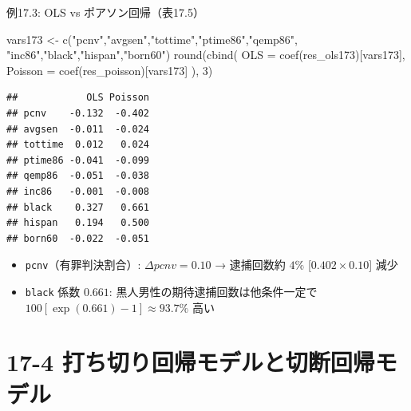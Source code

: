 \documentclass[
  ignorenonframetext,
]{beamer}
\newenvironment{Shaded}{\begin{snugshade}}{\end{snugshade}}
\newcommand{\AttributeTok}[1]{\textcolor[rgb]{0.77,0.63,0.00}{#1}}
\newcommand{\DecValTok}[1]{\textcolor[rgb]{0.00,0.00,0.81}{#1}}
\newcommand{\FunctionTok}[1]{\textcolor[rgb]{0.00,0.00,0.00}{#1}}
\newcommand{\NormalTok}[1]{#1}
\newcommand{\OtherTok}[1]{\textcolor[rgb]{0.56,0.35,0.01}{#1}}
\newcommand{\StringTok}[1]{\textcolor[rgb]{0.31,0.60,0.02}{#1}}
\providecommand{\tightlist}{%
  \setlength{\itemsep}{0pt}\setlength{\parskip}{0pt}}
\begin{document}
\begin{frame}[fragile]{例17.3: OLS vs ポアソン回帰（表17.5）}
\protect\hypertarget{ux4f8b17.3-ols-vs-ux30ddux30a2ux30bdux30f3ux56deux5e30ux886817.5}{}
\scriptsize

\begin{Shaded}
\begin{Highlighting}[]
\NormalTok{vars173 }\OtherTok{\textless{}{-}} \FunctionTok{c}\NormalTok{(}\StringTok{"pcnv"}\NormalTok{,}\StringTok{"avgsen"}\NormalTok{,}\StringTok{"tottime"}\NormalTok{,}\StringTok{"ptime86"}\NormalTok{,}\StringTok{"qemp86"}\NormalTok{,}
             \StringTok{"inc86"}\NormalTok{,}\StringTok{"black"}\NormalTok{,}\StringTok{"hispan"}\NormalTok{,}\StringTok{"born60"}\NormalTok{)}
\FunctionTok{round}\NormalTok{(}\FunctionTok{cbind}\NormalTok{(}
  \AttributeTok{OLS     =} \FunctionTok{coef}\NormalTok{(res\_ols173)[vars173],}
  \AttributeTok{Poisson =} \FunctionTok{coef}\NormalTok{(res\_poisson)[vars173]}
\NormalTok{), }\DecValTok{3}\NormalTok{)}
\end{Highlighting}
\end{Shaded}

\begin{verbatim}
##            OLS Poisson
## pcnv    -0.132  -0.402
## avgsen  -0.011  -0.024
## tottime  0.012   0.024
## ptime86 -0.041  -0.099
## qemp86  -0.051  -0.038
## inc86   -0.001  -0.008
## black    0.327   0.661
## hispan   0.194   0.500
## born60  -0.022  -0.051
\end{verbatim}

\begin{itemize}
\tightlist
\item
  \texttt{pcnv}（有罪判決割合）: \(\Delta pcnv = 0.10\) → 逮捕回数約
  \(4\%\) {[}\(0.402 \times 0.10\){]} 減少
\item
  \texttt{black} 係数 \(0.661\): 黒人男性の期待逮捕回数は他条件一定で
  \(100[\exp(0.661)-1] \approx 93.7\%\) 高い
\end{itemize}

\normalsize
\end{frame}

\hypertarget{ux6253ux3061ux5207ux308aux56deux5e30ux30e2ux30c7ux30ebux3068ux5207ux65adux56deux5e30ux30e2ux30c7ux30eb}{%
\section{17-4
打ち切り回帰モデルと切断回帰モデル}\label{ux6253ux3061ux5207ux308aux56deux5e30ux30e2ux30c7ux30ebux3068ux5207ux65adux56deux5e30ux30e2ux30c7ux30eb}}
\end{document}
